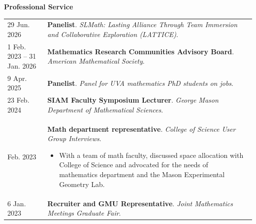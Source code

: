     \vspace{-1em}
    

    \textbf{\large Professional Service}
    
    \begin{center}
    {
    \renewcommand{\arraystretch}{1.2}
    \begin{longtable}{p{}  p{}}
    29 Jun.  2026 & \textbf{Panelist}. \textit{SLMath: Lasting Alliance Through Team Immersion and Collaborative Exploration (LATTICE)}.  \\ 
1 Feb.  2023 -- 31 Jan.  2026 & \textbf{Mathematics Research Communities Advisory Board}. \textit{American Mathematical Society}.  \\ 
9 Apr.  2025 & \textbf{Panelist}. \textit{Panel for UVA mathematics PhD students on jobs}.  \\ 
23 Feb.  2024 & \textbf{SIAM Faculty Symposium Lecturer}. \textit{George Mason Department of Mathematical Sciences}.  \\ 
 Feb.  2023 & \textbf{Math department representative}. \textit{College of Science User Group Interviews}. 
        \hspace{-1em}

        {\small
        \begin{itemize}
        \setlength{\parindent}{0em}
        \item[] With a team of math faculty, discussed space allocation with College of Science and advocated for the needs of mathematics department and the Mason Experimental Geometry Lab.
        \end{itemize}
        }
        \vspace{-1em}
         \\ 
6 Jan.  2023 & \textbf{Recruiter and GMU Representative}. \textit{Joint Mathematics Meetings Graduate Fair}. 
        \hspace{-1em}


\end{longtable}}
\end{center}

